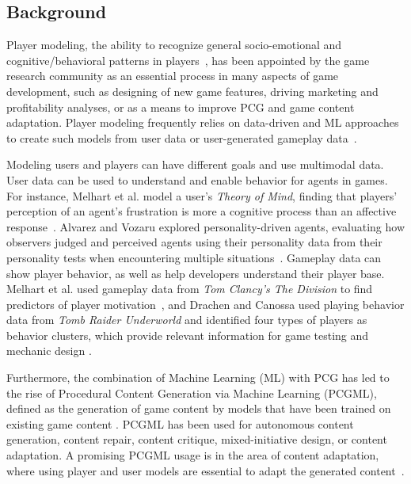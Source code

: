 \subsection{Background}


Player modeling, the ability to recognize general socio-emotional and cognitive/behavioral patterns in players~, has been appointed by the game research community as an essential process in many aspects of game development, such as designing of new game features, driving marketing and profitability analyses, or as a means to improve PCG and game content adaptation. Player modeling frequently relies on data-driven and ML approaches to create such models from user data or user-generated gameplay data~. 

Modeling users and players can have different goals and use multimodal data. User data can be used to understand and enable behavior for agents in games. For instance, Melhart et al. model a user's \textit{Theory of Mind}, finding that players' perception of an agent's frustration is more a cognitive process than an affective response~. Alvarez and Vozaru explored personality-driven agents, evaluating how observers judged and perceived agents using their personality data from their personality tests when encountering multiple situations~. Gameplay data can show player behavior, as well as help developers understand their player base. Melhart et al. used gameplay data from \textit{Tom Clancy's The Division} to find predictors of player motivation~, and Drachen and Canossa used playing behavior data from \textit{Tomb Raider Underworld} and identified four types of players as behavior clusters, which provide relevant information for game testing and mechanic design .

Furthermore, the combination of Machine Learning (ML) with PCG has led to the rise of Procedural Content Generation via Machine Learning (PCGML), defined as the generation of game content by models that have been trained on existing game content . PCGML has been used for autonomous content generation, content repair, content critique, mixed-initiative design, or content adaptation. A promising PCGML usage is in the area of content adaptation, where using player and user models are essential to adapt the generated content~. 

